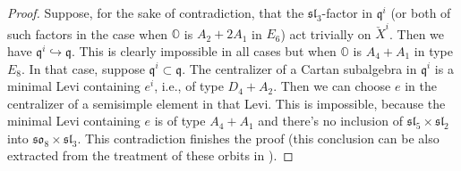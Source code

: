 \documentclass[12pt]{amsart}
\newcommand{\Orb}{\mathbb{O}}
\newcommand{\Z}{\mathbb{Z}}
\newcommand{\slf}{\mathfrak{sl}}
\theoremstyle{definition}
\numberwithin{equation}{section}
\begin{document}
\begin{proof}
Suppose, for the sake of contradiction, that the $\slf_3$-factor in $\mathfrak{q}^i$
(or both of such factors in the case when $\Orb$ is $A_2+2A_1$ in $E_6$) act trivially
on $\check{X}^i$. Then we have $\mathfrak{q}^i\hookrightarrow \mathfrak{q}$.
This is clearly impossible in all cases but when $\Orb$ is $A_4+A_1$ in type $E_8$.
In that case, suppose $\mathfrak{q}^i\subset \mathfrak{q}$. The centralizer of a Cartan subalgebra
in $\mathfrak{q}^i$ is a minimal Levi containing $e^i$, i.e., of type $D_4+A_2$. Then we can choose $e$
in the centralizer of a semisimple element in that Levi. This is impossible, because the minimal
Levi containing $e$ is of type $A_4+A_1$ and there's no inclusion of $\mathfrak{sl}_5\times \mathfrak{sl}_2$
into $\mathfrak{so}_8\times \mathfrak{sl}_3$. This contradiction finishes the proof (this conclusion can be also 
extracted from the treatment of these orbits in \cite{FJLS1}).  
%
\end{proof}
\end{document}
